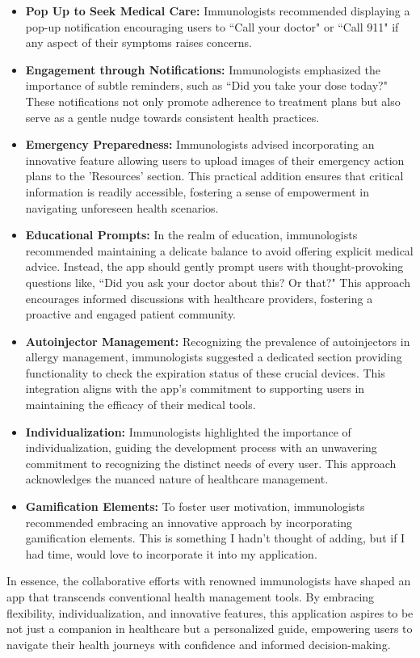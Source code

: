 \begin{itemize}
    \item \textbf{Pop Up to Seek Medical Care: }Immunologists recommended displaying a pop-up notification encouraging users to ``Call your doctor" or ``Call 911" if any aspect of their symptoms raises concerns.
    \item \textbf{Engagement through Notifications: }Immunologists emphasized the importance of subtle reminders, such as ``Did you take your dose today?" These notifications not only promote adherence to treatment plans but also serve as a gentle nudge towards consistent health practices.
    \item \textbf{Emergency Preparedness: }Immunologists advised incorporating an innovative feature allowing users to upload images of their emergency action plans to the 'Resources' section. This practical addition ensures that critical information is readily accessible, fostering a sense of empowerment in navigating unforeseen health scenarios.
    \item \textbf{Educational Prompts:} In the realm of education, immunologists recommended maintaining a delicate balance to avoid offering explicit medical advice. Instead, the app should gently prompt users with thought-provoking questions like, ``Did you ask your doctor about this? Or that?" This approach encourages informed discussions with healthcare providers, fostering a proactive and engaged patient community.
    \item \textbf{Autoinjector Management: }Recognizing the prevalence of autoinjectors in allergy management, immunologists suggested a dedicated section providing functionality to check the expiration status of these crucial devices. This integration aligns with the app's commitment to supporting users in maintaining the efficacy of their medical tools.
    \item \textbf{Individualization: }Immunologists highlighted the importance of individualization, guiding the development process with an unwavering commitment to recognizing the distinct needs of every user. This approach acknowledges the nuanced nature of healthcare management.
    \item \textbf{Gamification Elements: }To foster user motivation, immunologists recommended embracing an innovative approach by incorporating gamification elements. This is something I hadn't thought of adding, but if I had time, would love to incorporate it into my application.
\end{itemize}

In essence, the collaborative efforts with renowned immunologists have shaped an app that transcends conventional health management tools. By embracing flexibility, individualization, and innovative features, this application aspires to be not just a companion in healthcare but a personalized guide, empowering users to navigate their health journeys with confidence and informed decision-making.